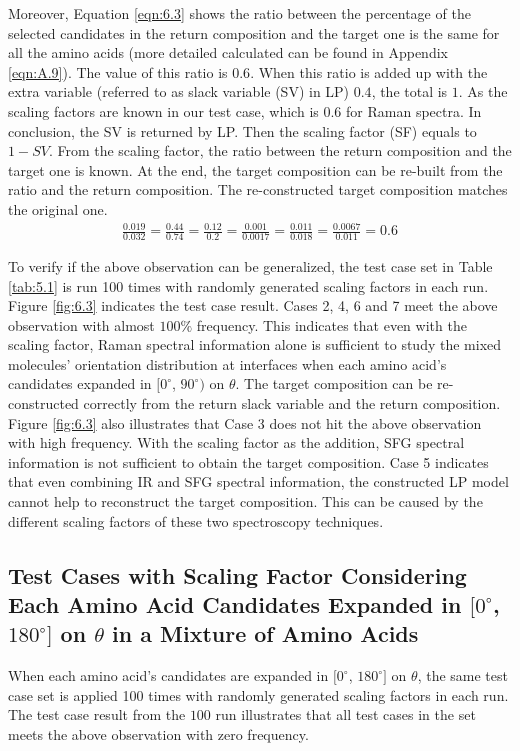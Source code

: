 Moreover, Equation \ref{eqn:6.3} shows the ratio between the percentage of the selected candidates in the return composition and the target one is the same for all the amino acids (more detailed calculated can be found in Appendix \ref{eqn:A.9}). The value of this ratio is $0.6$. When this ratio is added up with the extra variable (referred to as slack variable (SV) in LP) $0.4$, the total is $1$. As the scaling factors are known in our test case, which is $0.6$ for Raman spectra. In conclusion, the SV is returned by LP. Then the scaling factor (SF) equals to $1 - SV$. From the scaling factor, the ratio between the return composition and the target one is known. At the end, the target composition can be re-built from the ratio and the return composition. The re-constructed target composition matches the original one. \\

\begin{eqnarray} \label{eqn:6.3}
\frac{0.019}{0.032} = \frac{0.44}{0.74} = \frac{0.12}{0.2} =\frac{0.001}{0.0017}  = \frac{0.011}{0.018} = \frac{0.0067}{0.011} = 0.6
\end{eqnarray}

To verify if the above observation can be generalized, the test case set in Table \ref{tab:5.1} is run 100 times with randomly generated scaling factors in each run. Figure \ref{fig:6.3} indicates the test case result. Cases 2, 4, 6 and 7 meet the above observation with almost $100\%$ frequency. This indicates that even with the scaling factor, Raman spectral information alone is sufficient to study the mixed molecules' orientation distribution at interfaces when each amino acid's candidates expanded in $[0^{\circ}$, $90^{\circ})$ on $\theta$. The target composition can be re-constructed correctly from the return slack variable and the return composition. Figure \ref{fig:6.3} also illustrates that Case 3 does not hit the above observation with high frequency. With the scaling factor as the addition, SFG spectral information is not sufficient to obtain the target composition. Case 5 indicates that even combining IR and SFG spectral information, the constructed LP model cannot help to reconstruct the target composition. This can be caused by the different scaling factors of these two spectroscopy techniques. \\

\subsection{Test Cases with Scaling Factor Considering Each Amino Acid Candidates Expanded in $[0^{\circ}$, $180^{\circ}]$ on $\theta$ in a Mixture of Amino Acids}
When each amino acid's candidates are expanded in $[0^{\circ}$, $180^{\circ}]$ on $\theta$, the same test case set is applied 100 times with randomly generated scaling factors in each run. The test case result from the $100$ run illustrates that all test cases in the set meets the above observation with zero frequency. \\

